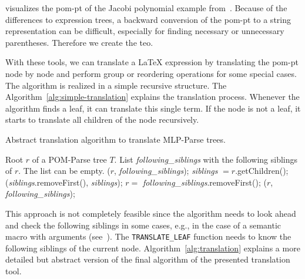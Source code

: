 \documentclass[a4paper,11pt]{article}
\theoremstyle{defTheoStyle}
\theoremstyle{defExampStyle}
\begin{document}
 visualizes the \gls*{pom-pt} of the Jacobi polynomial example from~. Because of the differences to expression trees, a backward conversion of the \gls*{pom-pt} to a string representation can be difficult, especially for finding necessary or unnecessary parentheses. Therefore we create the \gls*{teo}.

With these tools, we can translate a \LaTeX{} expression by translating the \gls*{pom-pt} node by node and perform group or reordering operations for some special cases. The algorithm is realized in a simple recursive structure. The Algorithm~\ref{alg:simple-translation} explains the translation process. Whenever the algorithm finds a leaf, it can translate this single term. If the node is not a leaf, it starts to translate all children of the node recursively. 

\begin{algorithm}[t]
\caption{Abstract translation algorithm to translate MLP-Parse trees.}\label{alg:translation}
	\begin{algorithmic}[1]
	\Require Root $r$ of a POM-Parse tree $T$. List \textit{following\_siblings} with the following siblings of $r$. The list can be empty.
		($r$, \textit{following\_siblings});\label{line:transLeaf}
	\Else
		\State \textit{siblings} $ = r$.getChildren(); 
		(\textit{siblings}.removeFirst(), \textit{siblings});\label{line:transSeq}
	\EndIf
	\label{line:ifNotEmpty}
		\State $r =$ \textit{following\_siblings}.removeFirst();
		($r$, \textit{following\_siblings});
	\EndIf
	\EndProcedure
	\end{algorithmic}
\end{algorithm}


This approach is not completely feasible since the algorithm needs to look ahead and check the following siblings in some cases, e.g., in the case of a semantic macro with arguments (see~). The {\footnotesize \verb|TRANSLATE_LEAF|} function needs to know the following siblings of the current node. Algorithm~\ref{alg:translation} explains a more detailed but abstract version of the final algorithm of the presented translation tool. 
\end{document}
